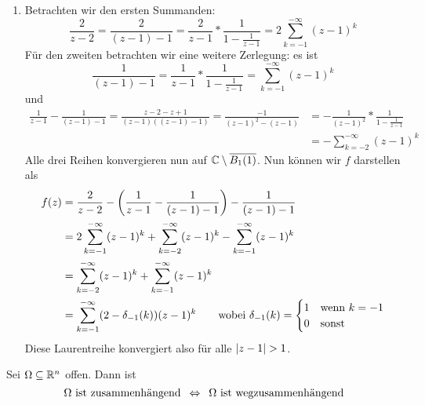 \begin{exercisePage}
\begin{enumerate}[label=(zu \alph*), leftmargin=*]
		\item Betrachten wir den ersten Summanden:
		\begin{equation*}
			\frac{2}{z-2} = \frac{2}{(z-1)-1} = \frac{2}{z-1} * \frac{1}{1 - \frac{1}{z-1}} = 2 \sum_{k=-1}^{-\infty} (z-1)^k
		\end{equation*}
		Für den zweiten betrachten wir eine weitere Zerlegung: es ist
		\begin{equation*}
			\frac{1}{(z-1)-1} = \frac{1}{z-1} * \frac{1}{1 - \frac{1}{z-1}} = \sum_{k=-1}^{-\infty} (z-1)^k
		\end{equation*}
		und
		\begin{equation*}
			\begin{aligned}
				\frac{1}{z-1} - \frac{1}{(z-1) - 1} 
				= \frac{z-2-z+1}{(z-1)((z-1)-1)}
				= \frac{-1}{(z-1)^2 - (z-1)}
				&= -\frac{1}{(z-1)^2} * \frac{1}{1 - \frac{1}{z-1}} \\
				&= -\sum_{k=-2}^{-\infty} (z-1)^k
			\end{aligned}
		\end{equation*}
		Alle drei Reihen konvergieren nun auf $\mathbb{C} \setminus \overline{B_1(1)}$. Nun können wir $f$ darstellen als
		\begin{equation*}
			\begin{aligned}
				f(z) &= \frac{2}{z-2} - \left( \frac{1}{z-1} - \frac{1}{(z-1) -1} \right) - \frac{1}{(z-1)-1} \\
				&= 2 \sum_{k=-1}^{-\infty} (z-1)^k + \sum_{k=-2}^{-\infty} (z-1)^k - \sum_{k=-1}^{-\infty} (z-1)^k \\
				&= \sum_{k=-2}^{-\infty} (z-1)^k + \sum_{k=-1}^{-\infty} (z-1)^k \\
				&= \sum_{k=-1}^{-\infty} (2 - \delta_{-1}(k)) (z-1)^k 
				\qquad \text{wobei } \delta_{-1}(k) = \begin{cases}
				1 & \text{wenn } k = -1 \\
				0 & \text{sonst} 
				\end{cases}
			\end{aligned}
		\end{equation*}
		Diese Laurentreihe konvergiert also für alle $\left| z-1 \right| > 1$.
	\end{enumerate}
	

	\begin{task}
		Sei $\Omega \subseteq \mathbb{R}^n$ offen. Dann ist
		\begin{equation*}
			\Omega \text{ ist zusammenhängend} \enskip \Leftrightarrow \enskip \Omega \text{ ist wegzusammenhängend}
		\end{equation*}
	\end{task}


\end{exercisePage}
